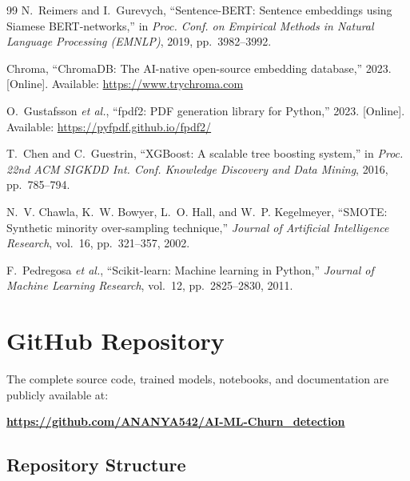 \documentclass[conference]{IEEEtran}
\begin{document}
\begin{thebibliography}{99}
N.~Reimers and I.~Gurevych,
``Sentence-BERT: Sentence embeddings using Siamese BERT-networks,''
in \textit{Proc. Conf. on Empirical Methods in Natural Language Processing
(EMNLP)}, 2019, pp.~3982--3992.

Chroma,
``ChromaDB: The AI-native open-source embedding database,''
2023. [Online].
Available: \url{https://www.trychroma.com}

O.~Gustafsson \textit{et al.},
``fpdf2: PDF generation library for Python,''
2023. [Online].
Available: \url{https://pyfpdf.github.io/fpdf2/}

T.~Chen and C.~Guestrin,
``XGBoost: A scalable tree boosting system,''
in \textit{Proc. 22nd ACM SIGKDD Int. Conf. Knowledge Discovery and Data
Mining}, 2016, pp.~785--794.

N.~V. Chawla, K.~W. Bowyer, L.~O. Hall, and W.~P. Kegelmeyer,
``SMOTE: Synthetic minority over-sampling technique,''
\textit{Journal of Artificial Intelligence Research}, vol.~16,
pp.~321--357, 2002.

F.~Pedregosa \textit{et al.},
``Scikit-learn: Machine learning in Python,''
\textit{Journal of Machine Learning Research}, vol.~12, pp.~2825--2830,
2011.

\end{thebibliography}

\appendix

\section{GitHub Repository}

The complete source code, trained models, notebooks, and documentation
are publicly available at:

\begin{center}
\textbf{\url{https://github.com/ANANYA542/AI-ML-Churn_detection}}
\end{center}

\subsection{Repository Structure}
\end{document}
